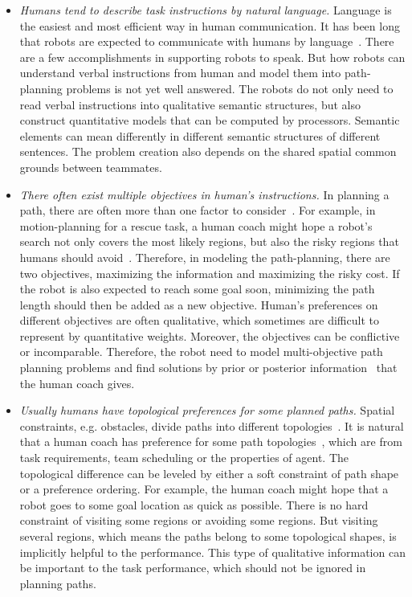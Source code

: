 \documentclass[phd]{byuprop}
\begin{document}
\begin{itemize}

\item {\em Humans tend to describe task instructions by natural language.}
Language is the easiest and most efficient way in human communication.
It has been long that robots are expected to communicate with humans by language~\cite{Kollar:2010:TUN:1734454.1734553,howard2014natural}. 
There are a few accomplishments in supporting robots to speak.
But how robots can understand verbal instructions from human and model them into path-planning problems is not yet well answered. 
The robots do not only need to read verbal instructions into qualitative semantic structures, but also construct quantitative models that can be computed by processors.
Semantic elements can mean differently in different semantic structures of different sentences.
The problem creation also depends on the shared spatial common grounds between teammates.

\item {\em There often exist multiple objectives in human's instructions.}
In planning a path, there are often more than one factor to consider~\cite{Ahmed2013}.
For example, in motion-planning for a rescue task, a human coach might hope a robot's search not only covers the most likely regions, but also the risky regions that humans should avoid~\cite{Yi2014}.
Therefore, in modeling the path-planning, there are two objectives, maximizing the information and maximizing the risky cost.
If the robot is also expected to reach some goal soon, minimizing the path length should then be added as a new objective.
Human's preferences on different objectives are often qualitative, which sometimes are difficult to represent by quantitative weights.
Moreover, the objectives can be conflictive or incomparable.
Therefore, the robot need to model multi-objective path planning problems and find solutions by prior or posterior information~\cite{Miettinen1999} that the human coach gives.

\item {\em Usually humans have topological preferences for some planned paths.}
Spatial constraints, e.g. obstacles, divide paths into different topologies~\cite{Bhattachary2010}.
It is natural that a human coach has preference for some path topologies~\cite{Yi2014}, which are from task requirements, team scheduling or the properties of agent.
The topological difference can be leveled by either a soft constraint of path shape or a preference ordering.
For example, the human coach might hope that a robot goes to some goal location as quick as possible.
There is no hard constraint of visiting some regions or avoiding some regions.
But visiting several regions, which means the paths belong to some topological shapes, is implicitly helpful to the performance.
This type of qualitative information can be important to the task performance, which should not be ignored in planning paths.

\end{itemize} 
\end{document}
